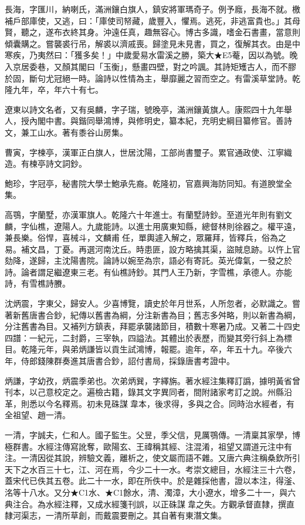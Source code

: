 \begin{pinyinscope}
長海，字匯川，納喇氏，滿洲鑲白旗人，鎮安將軍瑪奇子。例予廕，長海不就。檄補戶部庫使，又逃，曰：「庫使司帑藏，歲豐入，懼焉。逃死，非逃富貴也。」其母賢，聽之，遂布衣終其身。沖遠任真，趣無容心。博古多識，嗜金石書畫，當意則傾囊購之。嘗襲裘行吊，解裘以濟戚喪。歸塗見未見書，買之，復解其衣。由是中寒疾，乃夷然曰：「獲多矣！」中歲愛易水雷溪之勝，築大★E5菴，因以為號。晚入京居委巷，又顏其閣曰「玉衡」，懸畫四壁，對之吟諷。其詩矩矱古人，而不膠於固，斷句尤冠絕一時。論詩以性情為主，舉靡麗之習而空之。有雷溪草堂詩。乾隆九年，卒，年六十有七。

遼東以詩文名者，又有吳麟，字子瑞，號晚亭，滿洲鑲黃旗人。康熙四十九年舉人，授內閣中書。與鍇同舉鴻博，與修明史，纂本紀，充明史綱目纂修官。善詩文，兼工山水。著有黍谷山房集。

曹寅，字楝亭，漢軍正白旗人，世居沈陽，工部尚書璽子。累官通政使、江寧織造。有楝亭詩文詞鈔。

鮑珍，字冠亭，秘書院大學士鮑承先裔。乾隆初，官嘉興海防同知。有道腴堂全集。

高鶚，字蘭墅，亦漢軍旗人。乾隆六十年進士。有蘭墅詩鈔。至道光年則有劉文麟，字仙樵，遼陽人。九歲能詩。以進士用廣東知縣，總督林則徐器之。權平遠，兼長樂。俗悍，喜械斗，文麟甫任，單輿遽入解之，眾羅拜，皆釋兵，俗為之易。補文昌，丁憂。再選河南沈丘。時患匪，設方略擒其渠，盜賊息跡。以忤上官劾降，遂歸，主沈陽書院。論詩以婉至為宗，語必有寄託。英光偉氣，一發之於詩。論者謂足繼遼東三老。有仙樵詩鈔。其門人王乃新，字雪樵，承德人。亦能詩，有雪樵詩賸。

沈炳震，字東父，歸安人。少喜博覽，讀史於年月世系，人所忽者，必默識之。嘗著新舊唐書合鈔，紀傳以舊書為綱，分注新書為目；舊志多舛略，則以新書為綱，分注舊書為目。又補列方鎮表，拜罷承襲諸節目，積數十寒暑乃成。又著二十四史四譜：一紀元，二封爵，三宰執，四謚法。其體出於表歷，而變其旁行斜上為標目。乾隆元年，與弟炳謙皆以貢生試鴻博，報罷。逾年，卒，年五十九。卒後六年，侍郎錢陳群奏進其唐書合鈔，詔付書局，採錄唐書考證中。

炳謙，字幼孜，炳震季弟也。次弟炳巽，字繹旃。著水經注集釋訂譌，據明黃省曾刊本，以己意校定之。遍檢古籍，錄其文字異同者，間附諸家考訂之說。州縣沿革，則悉以今名釋焉。初未見硃謀韋本，後求得，多與之合。同時治水經者，有全祖望、趙一清。

一清，字誠夫，仁和人。國子監生。父昱，季父信，見厲鶚傳。一清稟其家學，博極群書。水經注傳寫訛奪，歐陽玄、王禕稱其經、注混淆，祖望又謂道元注中有注。一清因從其說，辨驗文義，離析之，使文屬而語不雜。又唐六典注稱桑欽所引天下之水百三十七，江、河在焉，今少二十一水。考崇文總目，水經注三十六卷，蓋宋代已佚其五卷。此二十一水，即在所佚中。於是雜採他書，證以本注，得滏、洺等十八水。又分★C1水、★C1餘水，清、濁漳，大小遼水，增多二十一，與六典注合。為水經注釋，又成水經箋刊誤，以正硃謀韋之失。方觀承督直隸，撰直隸河渠志，一清所草創，而戴震要刪之。其自著有東潛文集。


\end{pinyinscope}
